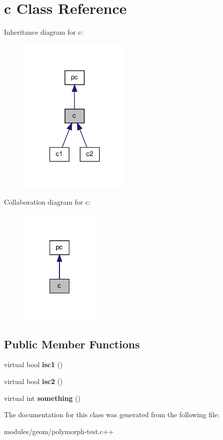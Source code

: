\hypertarget{classc}{\section{c Class Reference}
\label{classc}
}


Inheritance diagram for c\-:\nopagebreak
\begin{figure}[H]
\begin{center}
\leavevmode
\includegraphics[width=154pt]{classc__inherit__graph}
\end{center}
\end{figure}


Collaboration diagram for c\-:\nopagebreak
\begin{figure}[H]
\begin{center}
\leavevmode
\includegraphics[width=108pt]{classc__coll__graph}
\end{center}
\end{figure}
\subsection*{Public Member Functions}
\begin{DoxyCompactItemize}
\item 
\hypertarget{classc_a833d7d8c6c70b2aa9040a2aa574748ba}{virtual bool {\bfseries isc1} ()}\label{classc_a833d7d8c6c70b2aa9040a2aa574748ba}

\item 
\hypertarget{classc_a72a8341d6d98216ca5e86c01f7c20e0c}{virtual bool {\bfseries isc2} ()}\label{classc_a72a8341d6d98216ca5e86c01f7c20e0c}

\item 
\hypertarget{classc_a92ae4e07d48770cff8252ebc9ca6dadf}{virtual int {\bfseries something} ()}\label{classc_a92ae4e07d48770cff8252ebc9ca6dadf}

\end{DoxyCompactItemize}


The documentation for this class was generated from the following file\-:\begin{DoxyCompactItemize}
\item 
modules/geom/polymorph-\/test.\-c++\end{DoxyCompactItemize}
